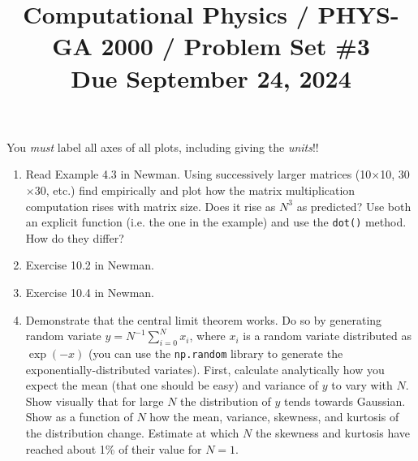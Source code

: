 \documentclass[11pt, preprint]{aastex}
\begin{document}
\title{\bf Computational Physics / PHYS-GA 2000 / Problem Set \#3
\\ Due September 24, 2024}

You {\it must} label all axes of all plots, including giving the {\it
  units}!!

\begin{enumerate}
  \item Read Example 4.3 in Newman. Using successively larger matrices
    (10$\times$10, 30$\times$30, etc.) find empirically and plot how
    the matrix multiplication computation rises with matrix size. Does
    it rise as $N^3$ as predicted? Use both an explicit function
    (i.e. the one in the example) and use the {\tt dot()} method. How
    do they differ?

  \item Exercise 10.2 in Newman.

  \item Exercise 10.4 in Newman.

  \item Demonstrate that the central limit theorem works. Do so by
    generating random variate $y=N^{-1} \sum_{i=0}^N x_i$, where $x_i$
    is a random variate distributed as $\exp(-x)$ (you can use the
    {\tt np.random} library to generate the exponentially-distributed
    variates). First, calculate analytically how you expect the mean
    (that one should be easy) and variance of $y$ to vary with
    $N$. Show visually that for large $N$ the distribution of $y$
    tends towards Gaussian. Show as a function of $N$ how the mean,
    variance, skewness, and kurtosis of the distribution
    change. Estimate at which $N$ the skewness and kurtosis have
    reached about 1\% of their value for $N=1$.

\end{enumerate}
\end{document}
